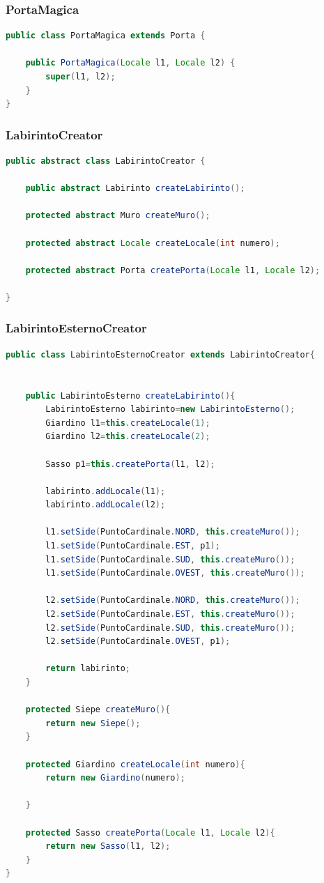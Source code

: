 \documentclass{article}
\begin{document}
\subsubsection{PortaMagica}
\begin{lstlisting}[language=Java]
public class PortaMagica extends Porta {

	public PortaMagica(Locale l1, Locale l2) {
		super(l1, l2);
	}
}
\end{lstlisting}
\subsubsection{LabirintoCreator}
\begin{lstlisting}[language=Java]
public abstract class LabirintoCreator {
	
	public abstract Labirinto createLabirinto();

	protected abstract Muro createMuro();
	
	protected abstract Locale createLocale(int numero);
	
	protected abstract Porta createPorta(Locale l1, Locale l2);
	
}
\end{lstlisting}

\subsubsection{LabirintoEsternoCreator}
\begin{lstlisting}[language=Java]
public class LabirintoEsternoCreator extends LabirintoCreator{
	
	
	public LabirintoEsterno createLabirinto(){
		LabirintoEsterno labirinto=new LabirintoEsterno();
		Giardino l1=this.createLocale(1);
		Giardino l2=this.createLocale(2);
		
		Sasso p1=this.createPorta(l1, l2);
		
		labirinto.addLocale(l1);
		labirinto.addLocale(l2);
		
		l1.setSide(PuntoCardinale.NORD, this.createMuro());
		l1.setSide(PuntoCardinale.EST, p1);
		l1.setSide(PuntoCardinale.SUD, this.createMuro());
		l1.setSide(PuntoCardinale.OVEST, this.createMuro());
		
		l2.setSide(PuntoCardinale.NORD, this.createMuro());
		l2.setSide(PuntoCardinale.EST, this.createMuro());
		l2.setSide(PuntoCardinale.SUD, this.createMuro());
		l2.setSide(PuntoCardinale.OVEST, p1);
		
		return labirinto;
	}
	
	protected Siepe createMuro(){
		return new Siepe();
	}
	
	protected Giardino createLocale(int numero){
		return new Giardino(numero);
		
	}
	
	protected Sasso createPorta(Locale l1, Locale l2){
		return new Sasso(l1, l2);
	}	
}
\end{lstlisting}
\end{document}

